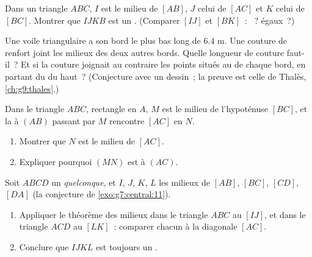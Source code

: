 \begin{exercise}[$\star\star$]\label{exo:g8:midpoints:6}
Dans un triangle $ABC$, $I$ est le milieu de $[AB]$, $J$ celui de
$[AC]$ et $K$ celui de $[BC]$. Montrer que $IJKB$ est un
. (Comparer $[IJ]$ et $[BK]$~: ~? égaux~?)
\end{exercise}

\begin{exercise}[$\star\star$]\label{exo:g8:midpoints:7}
Une voile triangulaire a son bord le plus bas long de $6.4$ m. Une
couture de renfort joint les milieux des deux autres bords. Quelle
longueur de couture faut-il~? Et si la couture joignait au contraire
les points situés au  de chaque bord, en partant du  du
haut~? (Conjecture avec un dessin~; la preuve est celle de Thalès,
\cref{ch:g9:thales}.)
\end{exercise}

\begin{exercise}[$\star\star$]\label{exo:g8:midpoints:8}
Dans le triangle $ABC$, rectangle en $A$, $M$ est le milieu de
l'hypoténuse $[BC]$, et la  à $(AB)$ passant par $M$
rencontre $[AC]$ en $N$.
\begin{enumerate}
  \item Montrer que $N$ est le milieu de $[AC]$.
  \item Expliquer pourquoi $(MN)$ est  à $(AC)$.
\end{enumerate}
\end{exercise}

\begin{exercise}[$\star\star\star$]\label{exo:g8:midpoints:9}
Soit $ABCD$ un  \emph{quelconque}, et $I$, $J$, $K$, $L$
les milieux de $[AB]$, $[BC]$, $[CD]$, $[DA]$ (la conjecture de
\cref{exo:g7:central:11}).
\begin{enumerate}
  \item Appliquer le théorème des milieux dans le triangle $ABC$ au
         $[IJ]$, et dans le triangle $ACD$ au  $[LK]$~:
        comparer chacun à la diagonale $[AC]$.
  \item Conclure que $IJKL$ est toujours un .
\end{enumerate}
\end{exercise}

